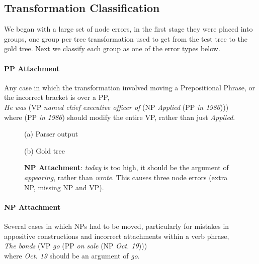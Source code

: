 \subsection{Transformation Classification}

We began with a large set of node errors, in the first stage they were placed
into groups, one group per tree transformation used to get from the test tree
to the gold tree.  Next we classify each group as one of the error types below.

\paragraph{PP Attachment} Any case in which the transformation involved moving a Prepositional Phrase, or the incorrect bracket is over a PP, \myeg \\ 
\emph{He was} (VP \emph{named chief executive officer of} (NP \emph{Applied} (PP \emph{in 1986}))) \\
where (PP \emph{in 1986}) should modify the entire VP, rather than just \emph{Applied}.

\begin{figure}
\begin{center}

\vspace{3mm}
(a) Parser output

\vspace{3mm}


(b) Gold tree
\end{center}
\derivspace
\caption{
	\label{fig:NP-attachment}
	\textbf{NP Attachment}: \emph{today} is too high, it should be the argument
	of \emph{appearing}, rather than \emph{wrote}.  This causes three node errors
	(extra NP, missing NP and VP).
}
\derivaftercompress
\end{figure}

\paragraph{NP Attachment} Several cases in which NPs had to be moved, particularly for mistakes in appositive constructions and incorrect attachments within a verb phrase, \myeg \\
\emph{The bonds} (VP \emph{go} (PP \emph{on sale} (NP \emph{Oct.\@\xspace 19}))) \\
where \emph{Oct.\@\xspace 19} should be an argument of \emph{go}.

